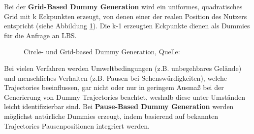 Bei der \textbf{Grid-Based Dummy Generation} \cite{Lu2008} wird ein uniformes, quadratisches Grid mit k Eckpunkten erzeugt, von denen einer der realen Position des Nutzers entspricht (siehe Abbildung \ref{fig_Lu2008}). Die k-1 erzeugten Eckpunkte dienen als Dummies für die Anfrage an LBS.
\begin{figure}[!h]
	\centering
	\caption{Circle- und Grid-based Dummy Generation, Quelle: \protect\cite{Lu2008}}
	\label{fig_Lu2008}
\end{figure}

Bei vielen Verfahren werden Umweltbedingungen (z.B. unbegehbares Gelände) und menschliches Verhalten (z.B. Pausen bei Sehenswürdigkeiten), welche Trajectories beeinflussen, gar nicht oder nur in geringem Ausmaß bei der Generierung von Dummy Trajectories beachtet, weshalb diese unter Umständen leicht identifizierbar sind. Bei \textbf{Pause-Based Dummy Generation} \cite{Kato2012} werden möglichst natürliche Dummies erzeugt, indem basierend auf bekannten Trajectories Pausenpositionen integriert werden.
